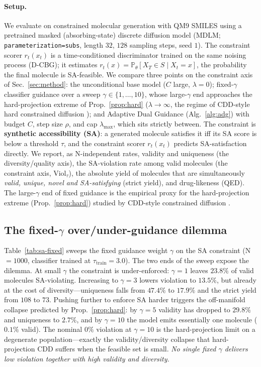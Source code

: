 \documentclass{article}
\begin{document}
\paragraph{Setup.} We evaluate on constrained molecular generation with QM9 SMILES using a pretrained masked (absorbing-state) discrete diffusion model (MDLM; \texttt{parameterization=subs}, length $32$, $128$ sampling steps, seed $1$). The constraint scorer $r_t(x_t)$ is a time-conditioned discriminator trained on the same noising process (D-CBG); it estimates $r_t(x)=\mathbb P_\theta[X_T\in S\mid X_t=x]$, the probability the final molecule is SA-feasible. We compare three points on the constraint axis of Sec.~\ref{sec:method}: the unconditional base model ($C$ large, $\lambda{=}0$); fixed-$\gamma$ classifier guidance over a sweep $\gamma\in\{1,\dots,10\}$, whose large-$\gamma$ end approaches the hard-projection extreme of Prop.~\ref{prop:hard} ($\lambda\to\infty$, the regime of CDD-style hard constrained diffusion \cite{cardei2025cdd}); and Adaptive Dual Guidance (Alg.~\ref{alg:adg}) with budget $C$, step size $\rho$, and cap $\lambda_{\max}$, which sits strictly between. The constraint is \textbf{synthetic accessibility (SA)}: a generated molecule satisfies it iff its SA score is below a threshold $\tau$, and the constraint scorer $r_t(x_t)$ predicts SA-satisfaction directly. We report, as N-independent rates, validity and uniqueness (the diversity/quality axis), the SA-violation rate among valid molecules (the constraint axis, $\mathrm{Viol}_\tau$), the absolute yield of molecules that are simultaneously \emph{valid, unique, novel and SA-satisfying} (strict yield), and drug-likeness (QED). The large-$\gamma$ end of fixed guidance is the empirical proxy for the hard-projection extreme (Prop.~\ref{prop:hard}) studied by CDD-style constrained diffusion \cite{cardei2025cdd}.

\subsection{The fixed-$\gamma$ over/under-guidance dilemma}
Table~\ref{tab:sa-fixed} sweeps the fixed guidance weight $\gamma$ on the SA constraint (N$=1000$, classifier trained at $\tau_{\text{train}}{=}3.0$). The two ends of the sweep expose the dilemma. At small $\gamma$ the constraint is under-enforced: $\gamma{=}1$ leaves $23.8\%$ of valid molecules SA-violating. Increasing to $\gamma{=}3$ lowers violation to $13.5\%$, but already at the cost of diversity---uniqueness falls from $47.4\%$ to $17.9\%$ and the strict yield from $108$ to $73$. Pushing further to enforce SA harder triggers the off-manifold collapse predicted by Prop.~\ref{prop:hard}: by $\gamma{=}5$ validity has dropped to $29.8\%$ and uniqueness to $2.7\%$, and by $\gamma{=}10$ the model emits essentially one molecule ($0.1\%$ valid). The nominal $0\%$ violation at $\gamma{=}10$ is the hard-projection limit on a degenerate population---exactly the validity/diversity collapse that hard-projection CDD suffers when the feasible set is small. \emph{No single fixed $\gamma$ delivers low violation together with high validity and diversity.}
\end{document}
